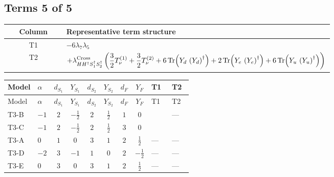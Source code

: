 \documentclass[8pt]{article}
\begin{document}
\begin{landscape}
\subsection*{Terms 5 of 5}
\begin{center}
\begin{tabular}{@{}c >{\raggedright\arraybackslash}p{0.82\linewidth}@{}}
\toprule
Column & Representative term structure \\
\midrule
T1 & \(\displaystyle -6 {\lambda_{7}} {\lambda_5}\) \\
\midrule
T2 & \(\displaystyle +{\lambda_{H H^\dagger S_1^\dagger S_2^\dagger}^{\rm Cross}} \left(\frac{3}{2} T_{\nu}^{(1)}+\frac{3}{2} T_{\nu}^{(2)}+6 \operatorname{Tr}\!\left({Y_d}\,\left({Y_d}\right)^{\dagger}\right)+2 \operatorname{Tr}\!\left({Y_e}\,\left({Y_e}\right)^{\dagger}\right)+6 \operatorname{Tr}\!\left({Y_u}\,\left({Y_u}\right)^{\dagger}\right)\right)\) \\
\midrule
\bottomrule
\end{tabular}
\end{center}
\smallskip
\tiny
\begin{longtable}{@{}llcccccc >{\raggedright\arraybackslash}p{0.21\linewidth} >{\raggedright\arraybackslash}p{0.21\linewidth}@{}}
\toprule
Model & $\alpha$ & $d_{S_1}$ & $Y_{S_1}$ & $d_{S_2}$ & $Y_{S_2}$ & $d_F$ & $Y_F$ & T1 & T2 \\
\midrule
\endfirsthead
\toprule
Model & $\alpha$ & $d_{S_1}$ & $Y_{S_1}$ & $d_{S_2}$ & $Y_{S_2}$ & $d_F$ & $Y_F$ & T1 & T2 \\
\midrule
\endhead
T3-B & $-1$ & $2$ & $-\frac{1}{2}$ & $2$ & $\frac{1}{2}$ & $1$ & $0$ & \scriptsize\adjustbox{max width=\linewidth}{$\begin{gathered} -6 {\lambda_{7}} {\lambda_5}\end{gathered}$} & --- \\
\midrule
T3-C & $-1$ & $2$ & $-\frac{1}{2}$ & $2$ & $\frac{1}{2}$ & $3$ & $0$ & \scriptsize\adjustbox{max width=\linewidth}{$\begin{gathered} -6 {\lambda_{7}} {\lambda_5}\end{gathered}$} & \scriptsize\adjustbox{max width=\linewidth}{$\begin{gathered} +{\lambda_{H H^\dagger S_1^\dagger S_2^\dagger}^{\rm Cross}} \left(\frac{3}{2} T_{\nu}^{(1)}+\frac{3}{2} T_{\nu}^{(2)}+6 \operatorname{Tr}\!\left({Y_d}\,\left({Y_d}\right)^{\dagger}\right)+2 \operatorname{Tr}\!\left({Y_e}\,\left({Y_e}\right)^{\dagger}\right)+6 \operatorname{Tr}\!\left({Y_u}\,\left({Y_u}\right)^{\dagger}\right)\right)\end{gathered}$} \\
\midrule
T3-A & $0$ & $1$ & $0$ & $3$ & $1$ & $2$ & $\frac{1}{2}$ & --- & --- \\
\midrule
T3-D & $-2$ & $3$ & $-1$ & $1$ & $0$ & $2$ & $-\frac{1}{2}$ & --- & --- \\
\midrule
T3-E & $0$ & $3$ & $0$ & $3$ & $1$ & $2$ & $\frac{1}{2}$ & --- & --- \\
\midrule
\bottomrule
\end{longtable}
\clearpage

\end{landscape}
\end{document}
